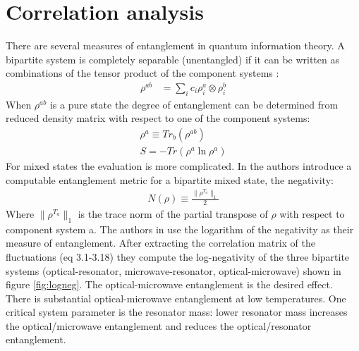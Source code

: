 \documentclass[a4paper,11pt, twocolumn]{article}
\numberwithin{equation}{section}
\begin{document}
\section{Correlation analysis}
There are several measures of entanglement in quantum information theory. 
A bipartite system is completely separable (unentangled) if it can be written as combinations of the tensor product of the component systems \cite{ballentine}:
\begin{align}
 \rho^{ab} &= \sum_i c_i \rho_i^a \otimes \rho_i^b
\end{align}
When $\rho^{ab}$ is a pure state the degree of entanglement can be determined from reduced density matrix with respect to one of the component systems:
\begin{align}
 \rho^a \equiv Tr_b(\rho^{ab} )\\
 S = -Tr(\rho^a\ln{\rho^a} )
\end{align}
For mixed states the evaluation is more complicated. 
In \cite{qent} the authors introduce a computable entanglement metric for a bipartite mixed state, the negativity:
\begin{align}
 N(\rho) \equiv \frac{\|\rho^{T_a}\|_1}{2}
\end{align}
Where $\|\rho^{T_a}\|_1$ is the trace norm of the partial transpose of $\rho$ with respect to component system a.
The authors in \cite{nanoMR} use the logarithm of the negativity as their measure of entanglement. 
After extracting the correlation matrix of the fluctuations (eq 3.1-3.18) they compute the log-negativity of the three bipartite systems (optical-resonator, microwave-resonator, optical-microwave) shown in figure \ref{fig:logneg}.
The optical-microwave entanglement is the desired effect. 
There is substantial optical-microwave entanglement at low temperatures.
One critical system parameter is the resonator mass: lower resonator mass increases the optical/microwave entanglement and reduces the optical/resonator entanglement. 
\end{document}
